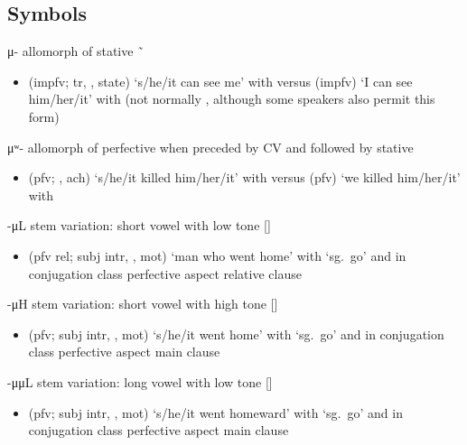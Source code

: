\subsection{Symbols}\label{sec:alphalist-sym}
\begin{morphdesc}[resume*=alphalist]
\item[μ-]\label{m:μ-}
	allomorph of stative  \~\ 
	\begin{itemize}
	\item	{} (impfv; tr, ,  state) ‘s/he/it can see me’
			with \newline
		versus  (impfv) ‘I can see him/her/it’
			with \newline
		(not normally , although some speakers also permit this form)
	\end{itemize}

\item[μʷ-]\label{m:μʷ-}
	allomorph of perfective  when preceded by CV and followed by stative 
	\begin{itemize}
	\item	{} (pfv; , ach) ‘s/he/it killed him/her/it’
			with \newline
		versus  (pfv) ‘we killed him/her/it’
			with 
	\end{itemize}

\item[-μL]\label{m:-μL}
	stem variation: short vowel with low tone []
	\begin{itemize}
	\item	{} (pfv rel; subj intr, , mot) ‘man who went home’
		with  ‘sg.\ go’ and 
		in  conjugation class perfective aspect relative clause
	\end{itemize}

\item[-μH]\label{m:-μH}
	stem variation: short vowel with high tone []
	\begin{itemize}
	\item	{} (pfv; subj intr, , mot) ‘s/he/it went home’
		with  ‘sg.\ go’ and 
		in  conjugation class perfective aspect main clause
	\end{itemize}

\item[-μμL]\label{m:-μμL}
	stem variation: long vowel with low tone []
	\begin{itemize}
	\item	{} (pfv; subj intr, , mot) ‘s/he/it went homeward’
		with  ‘sg.\ go’ and 
		in  conjugation class perfective aspect main clause
	\end{itemize}


\end{morphdesc}
